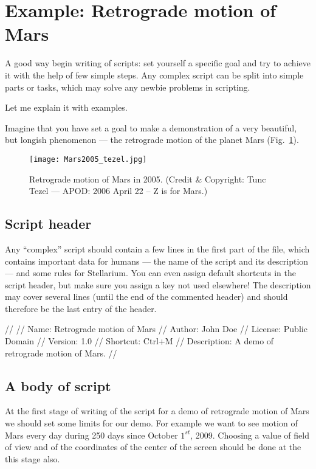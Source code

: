 \section{Example: Retrograde motion of Mars}
\label{sec:scripting:RetrogradeMotionOfMars}
A good way begin writing of scripts: set yourself a specific
goal and try to achieve it with the help of few simple steps. Any
complex script can be split into simple parts or tasks, which may solve any
newbie problems in scripting.

Let me explain it with examples.

Imagine that you have set a goal to make a demonstration of a  very
beautiful, but longish phenomenon --- the retrograde motion of the
planet Mars (Fig.~\ref{fig:Mars2005}).

\begin{figure}[tb]
\centering\texttt{[image: Mars2005\_tezel.jpg]}
\caption{Retrograde motion of Mars in 2005. {\small(Credit \& Copyright: Tunc Tezel --- APOD: 2006 April 22 -- Z is for Mars.)}}
\label{fig:Mars2005}
\end{figure}

\subsection{Script header}
Any ``complex'' script should contain a few lines in the first part 
of the file, which contains important data for humans --- the 
name of the script and its description --- and some rules for 
Stellarium. You can even assign default shortcuts in the script header, 
but make sure you assign a key not used elsewhere! The description 
may cover several lines (until the end of the commented header) 
and should therefore be the last entry of the header.

\begin{script}
//
// Name: Retrograde motion of Mars
// Author: John Doe
// License: Public Domain
// Version: 1.0
// Shortcut: Ctrl+M
// Description: A demo of retrograde motion of Mars.
//
\end{script}

\subsection{A body of script}
At the first stage of writing of the script for a demo of 
retrograde motion of Mars we should set some limits for 
our demo. For example we want to see motion of Mars every 
day during 250 days since October $1^{st}$,  2009. 
Choosing a value of field of view and of the coordinates 
of the center of the screen should be done at the this 
stage also. 

